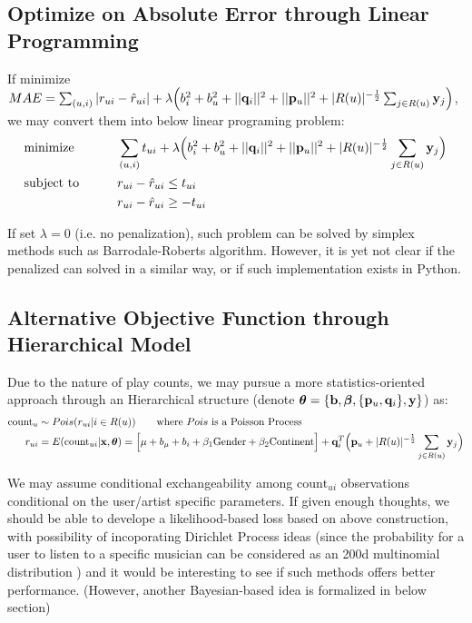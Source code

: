 \documentclass[11pt]{article}
\theoremstyle{definition}
\begin{document}
\subsection{Optimize on Absolute Error through Linear Programming}

If minimize $MAE = \sum_{(u, i)} |r_{ui} - \hat{r}_{ui}| + \lambda \Big(b_i^2 + b_u^2 + ||{\bf q}_i||^2 + ||{\bf p}_u||^2 +|R(u)|^{-\frac{1}{2}} \sum_{j \in R(u)}{\bf y}_j \Big)$, we may convert them into below linear programing problem:
\begin{alignat*}{3}
&\mbox{minimize} &&\qquad \sum_{(u, i)} t_{ui} +\lambda \Big(b_i^2 + b_u^2 + ||{\bf q}_i||^2 + ||{\bf p}_u||^2 +|R(u)|^{-\frac{1}{2}} \sum_{j \in R(u)}{\bf y}_j \Big)\\
&\mbox{subject to} &&\qquad r_{ui} - \hat{r}_{ui} \leq t_{ui}\\
& &&\qquad r_{ui} - \hat{r}_{ui} \geq -t_{ui}
\end{alignat*}

If set $\lambda = 0$ (i.e. no penalization), such problem can be solved by simplex methods such as Barrodale-Roberts algorithm. However, it is yet not clear if the penalized can solved in a similar way, or if such implementation exists in Python.

\subsection{Alternative Objective Function through Hierarchical Model}

Due to the nature of play counts, we may pursue a more statistics-oriented approach through an Hierarchical structure (denote $\boldsymbol{\theta} =  \{{\bf b}, \boldsymbol{\beta}, \{{\bf p}_u, {\bf q}_i\}, {\bf y}\}$) as:
\begin{align*}
\mbox{count}_{u} &\sim Pois(r_{ui} | i \in R(u)) 
\qquad \mbox{where } Pois \mbox{ is a Poisson Process}
\nonumber \\
r_{ui} & = E(\mbox{count}_{ui}|{\bf x}, \boldsymbol{\theta}) = \Big[ \mu + b_\mu + b_i + \beta_1\mbox{Gender} + \beta_2\mbox{Continent} \Big] + 
{\bf q}_i^T \Big({\bf p}_u+|R(u)|^{-\frac{1}{2}} \sum_{j \in R(u)}{\bf y}_j \Big)
\end{align*}

We may assume conditional exchangeability among $\mbox{count}_{ui}$ observations conditional on the user/artist specific parameters. If given enough thoughts, we should be able to develope a likelihood-based loss based on above construction, with possibility of incoporating Dirichlet Process ideas (since the probability for a user to listen to a specific musician can be considered as an 200d multinomial distribution ) and it would be interesting to see if such methods offers better performance. (However, another Bayesian-based idea is formalized in below section)
\end{document}
